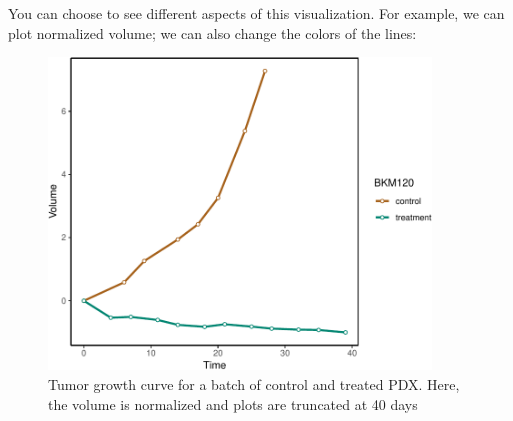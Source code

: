 \documentclass{article}\usepackage[]{graphicx}\usepackage[usenames,dvipsnames]{color}
\newcommand{\hlnum}[1]{\textcolor[rgb]{0.816,0.125,0.439}{#1}}%
\newcommand{\hlstr}[1]{\textcolor[rgb]{0.251,0.627,0.251}{#1}}%
\newcommand{\hlstd}[1]{\textcolor[rgb]{0.251,0.251,0.251}{#1}}%
\newcommand{\hlkwc}[1]{\textcolor[rgb]{0.251,0.251,0.251}{#1}}%
\newcommand{\hlkwd}[1]{\textcolor[rgb]{0.878,0.439,0.125}{#1}}%
\newenvironment{knitrout}{}{} %
\begin{document}
You can choose to see different aspects of this visualization. For example, we can plot normalized volume; we can also change the colors of the lines:
\begin{knitrout}
\color{fgcolor}\begin{figure}
\includegraphics[width=4in]{figure/pdxplot2-1} \caption{Tumor growth curve for a batch of control and treated PDX. Here, the volume is normalized and plots are truncated at 40 days}\label{fig:pdxplot2}
\end{figure}

\end{knitrout}
\end{document}
